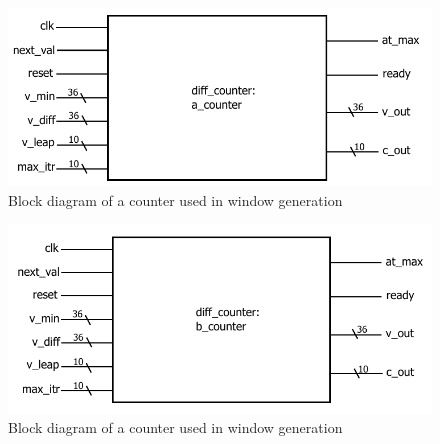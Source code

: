 \documentclass{article}
\begin{document}
\begin{figure}[h!]
  \centering
    \includegraphics[width=\textwidth]{block_diagrams/acounter.pdf}
  \caption{Block diagram of a counter used in window generation}
\end{figure}

\begin{figure}[h!]
  \centering
    \includegraphics[width=\textwidth]{block_diagrams/bcounter.pdf}
  \caption{Block diagram of a counter used in window generation}
\end{figure}
\end{document}
